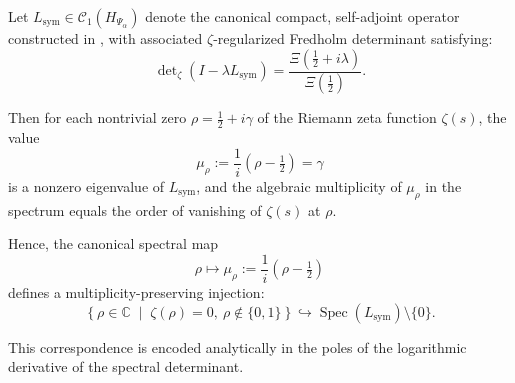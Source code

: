 \begin{lemma}
\label{lem:zero_to_eigenvalue_injection}
Let \( L_{\mathrm{sym}} \in \mathcal{C}_1(H_{\Psi_\alpha}) \) denote the canonical compact, self-adjoint operator constructed in , with associated \(\zeta\)-regularized Fredholm determinant satisfying:
\[
\det\nolimits_\zeta(I - \lambda L_{\mathrm{sym}}) = \frac{\Xi\left(\tfrac{1}{2} + i\lambda\right)}{\Xi\left(\tfrac{1}{2}\right)}.
\]

Then for each nontrivial zero \( \rho = \tfrac{1}{2} + i\gamma \) of the Riemann zeta function \( \zeta(s) \), the value
\[
\mu_\rho := \frac{1}{i}(\rho - \tfrac{1}{2}) = \gamma
\]
is a nonzero eigenvalue of \( L_{\mathrm{sym}} \), and the algebraic multiplicity of \( \mu_\rho \) in the spectrum equals the order of vanishing of \( \zeta(s) \) at \( \rho \).

\medskip
\noindent
Hence, the canonical spectral map
\[
\rho \longmapsto \mu_\rho := \frac{1}{i}(\rho - \tfrac{1}{2})
\]
defines a multiplicity-preserving injection:
\[
\left\{ \rho \in \mathbb{C} \;\middle|\; \zeta(\rho) = 0,\ \rho \notin \{0,1\} \right\}
\hookrightarrow
\operatorname{Spec}(L_{\mathrm{sym}}) \setminus \{0\}.
\]

\noindent
This correspondence is encoded analytically in the poles of the logarithmic derivative of the spectral determinant.
\end{lemma}
